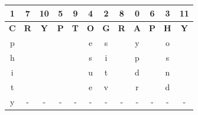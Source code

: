 \documentclass{ashoka-crypto}
\begin{document}
\begin{center}
\begin{tabular}{|c|c|c|c|c|c|c|c|c|c|c|c|}
\hline
1          & 7          & 10         & 5          & 9          & 4          & 2          & 8          & 0          & 6          & 3          & 11         \\ \hline
\textbf{C} & \textbf{R} & \textbf{Y} & \textbf{P} & \textbf{T} & \textbf{O} & \textbf{G} & \textbf{R} & \textbf{A} & \textbf{P} & \textbf{H} & \textbf{Y} \\ \hline
p          &            &            &            &            & e          & s          &            & y          &            & o          &            \\ \hline
h          &            &            &            &            & s          & i          &            & p          &            & s          &            \\ \hline
i          &            &            &            &            & u          & t          &            & d          &            & n          &            \\ \hline
t          &            &            &            &            & e          & v          &            & r          &            & d          &            \\ \hline
y          &     -       &    -        &      -     &     -       &      -      &     -       &     -       &      -      &     -       &       -     &  -            \\ \hline
\end{tabular}
\end{center}
\end{document}

